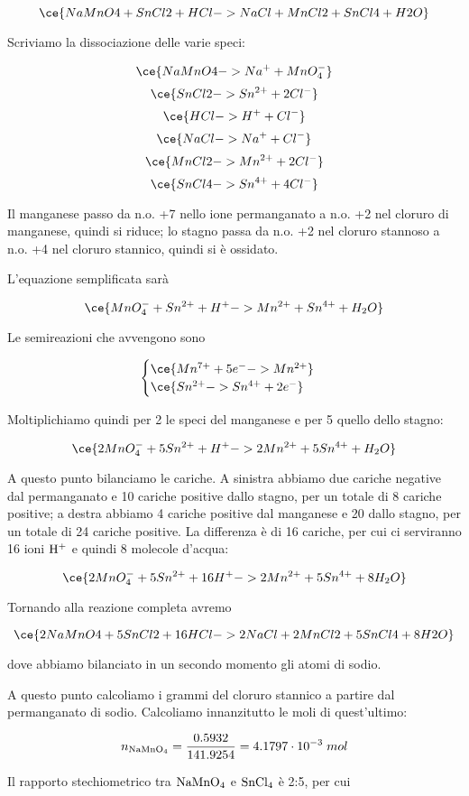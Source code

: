$$\ce{NaMnO4 + SnCl2 + HCl -> NaCl + MnCl2 + SnCl4 + H2O}$$

Scriviamo la dissociazione delle varie speci:

$$\ce{NaMnO4 -> Na^+ + MnO_4^-}$$
$$\ce{SnCl2 -> Sn^{2+} + 2Cl^-}$$
$$\ce{HCl -> H^+ + Cl^-}$$
$$\ce{NaCl -> Na^+ + Cl^-}$$
$$\ce{MnCl2 -> Mn^{2+} + 2Cl^-}$$
$$\ce{SnCl4 -> Sn^{4+} + 4Cl^-}$$

Il manganese passo da n.o. +7 nello ione permanganato a n.o. +2 nel cloruro di
manganese, quindi si riduce; lo stagno passa da n.o. +2 nel cloruro stannoso a n.o. +4 nel cloruro stannico, quindi si è ossidato.

L'equazione semplificata sarà

$$\ce{MnO_4^- + Sn^{2+} + H^+ -> Mn^{2+} + Sn^{4+} + H_2O}$$

Le semireazioni che avvengono sono

$$\begin{cases}
    \ce{Mn^{7+} + 5e^- -> Mn^{2+}}\\
    \ce{Sn^{2+} -> Sn^{4+} + 2e^-}
\end{cases}$$

Moltiplichiamo quindi per 2 le speci del manganese e per 5 quello dello stagno:

$$\ce{2MnO_4^- + 5Sn^{2+} + H^+ -> 2Mn^{2+} + 5Sn^{4+} + H_2O}$$

A questo punto bilanciamo le cariche. A sinistra abbiamo due cariche negative dal permanganato e 10 cariche positive dallo stagno, per un totale di 8 cariche positive; a destra abbiamo 4 cariche positive dal manganese e 20 dallo stagno, per un totale di 24 cariche positive. La differenza è di 16 cariche, per cui ci serviranno 16 ioni $\rm H^+$ e quindi 8 molecole d'acqua: 

$$\ce{2MnO_4^- + 5Sn^{2+} + 16H^+ -> 2Mn^{2+} + 5Sn^{4+} + 8H_2O}$$

Tornando alla reazione completa avremo

$$\ce{2NaMnO4 + 5SnCl2 + 16HCl -> 2NaCl + 2MnCl2 + 5SnCl4 + 8H2O}$$

dove abbiamo bilanciato in un secondo momento gli atomi di sodio.

A questo punto calcoliamo i grammi del cloruro stannico a partire dal permanganato di sodio. Calcoliamo innanzitutto le moli di quest'ultimo:

$$n_{\rm NaMnO_4}=\frac{0.5932}{141.9254}
=4.1797 \cdot 10^{-3}\;mol$$

Il rapporto stechiometrico tra $\rm NaMnO_4$ e $\rm SnCl_4$ è 2:5, per cui 

